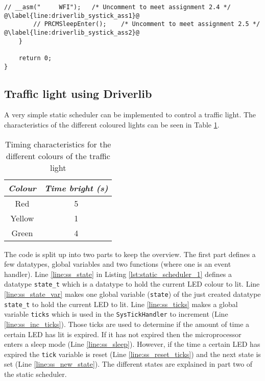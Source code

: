 \begin{lstlisting}[style=CStyle, caption={Toggling LEDs according to Table \ref{tab:led_scheme} using Driverlib}, captionpos=b, label={lst:led_systick_driverlib}, escapechar=@]
        // __asm("     WFI");   /* Uncomment to meet assignment 2.4 */              @\label{line:driverlib_systick_ass1}@
        // PRCMSleepEnter();    /* Uncomment to meet assignment 2.5 */              @\label{line:driverlib_systick_ass2}@
    }

    return 0;
}
\end{lstlisting}

\newpage
\subsection{Traffic light using Driverlib}

A very simple static scheduler can be implemented to control a traffic light.
The characteristics of the different coloured lights can be seen in Table \ref{tab:led_trafficlight}.

\begin{table}[H]
    \centering
    \begin{tabular}{|c|c|}
        \hline
        \textcolor{darkpink}{\textit{Colour}} & \textcolor{darkpink}{\textit{Time bright (s)}}\\
        \hline
        Red & 5 \\
        \hline
        Yellow & 1 \\
        \hline
        Green & 4 \\
        \hline
    \end{tabular}
            
    \label{tab:led_trafficlight}
    \caption{Timing characteristics for the different colours of the traffic light}
\end{table}

The code is split up into two parts to keep the overview.
The first part defines a few datatypes, global variables and two functions (where one is an event handler).
Line \ref{line:ss_state} in Listing \ref{lst:static_scheduler_1} defines a datatype \texttt{state\_t} which is a datatype to hold the current LED colour to lit.
Line \ref{line:ss_state_var} makes one global variable (\texttt{state}) of the just created datatype \texttt{state\_t} to hold the current LED to lit.
Line \ref{line:ss_ticks} makes a global variable \texttt{ticks} which is used in the \texttt{SysTickHandler} to increment (Line \ref{line:ss_inc_ticks}).
Those ticks are used to determine if the amount of time a certain LED has lit is expired.
If it has not expired then the microprocessor enters a sleep mode (Line \ref{line:ss_sleep}).
However, if the time a certain LED has expired the \texttt{tick} variable is reset (Line \ref{line:ss_reset_ticks}) and the next state is set (Line \ref{line:ss_new_state}).
The different states are explained in part two of the static scheduler.

